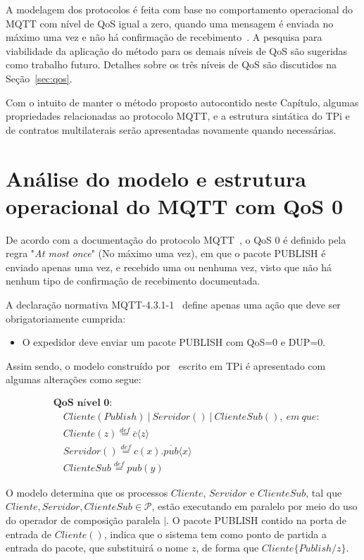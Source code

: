 A modelagem dos protocolos é feita com base no comportamento operacional do MQTT com nível de QoS igual a zero, quando uma mensagem é enviada no máximo uma vez e não há confirmação de recebimento~\cite{mqttv3.1.1}. A pesquisa para viabilidade da aplicação do método para os demais níveis de QoS são sugeridas como trabalho futuro. Detalhes sobre os três níveis de QoS são discutidos na Seção~\ref{sec:qos}.

Com o intuito de manter o método proposto autocontido neste Capítulo, algumas propriedades relacionadas ao protocolo MQTT, e a estrutura sintática do TPi e de contratos multilaterais serão apresentadas novamente quando necessárias.

\section{Análise do modelo e estrutura operacional do MQTT com QoS 0}

De acordo com a documentação do protocolo MQTT~\cite{mqttv3.1.1}, o QoS $0$ é definido pela regra "\textit{At most once}" (No máximo uma vez), em que o pacote PUBLISH é enviado apenas uma vez, e recebido uma ou nenhuma vez, visto que não há nenhum tipo de confirmação de recebimento documentada.

A declaração normativa MQTT-4.3.1-1~\cite{mqttv3.1.1} define apenas uma ação que deve ser obrigatoriamente cumprida:
\begin{itemize}
	\item O expedidor deve enviar um pacote PUBLISH com QoS=0 e DUP=0.
\end{itemize}

Assim sendo, o modelo construído por~\citeauthor{aziz2016formal} escrito em TPi é apresentado com algumas alterações como segue:

\begin{align}
&\textbf{QoS~nível~0:} \nonumber \\
&\quad Cliente(Publish)~|~Servidor()~|~ClienteSub(),~em~que: \nonumber \\
&\quad Cliente(z) \stackrel{def}{=} \overline{c}\langle z \rangle \nonumber \\
&\quad Servidor() \stackrel{def}{=} c(x).\overline{pub}\langle x \rangle \nonumber \\
&\quad ClienteSub \stackrel{def}{=} pub(y) \label{eq:mqtt_qos0}
\end{align}

O modelo determina que os processos $Cliente$, $Servidor$ e $ClienteSub$, tal que $Cliente, Servidor, ClienteSub \in \mathcal{P}$, estão executando em paralelo por meio do uso do operador de composição paralela $|$. O pacote PUBLISH contido na porta de entrada de $Cliente()$, indica que o sistema tem como ponto de partida a entrada do pacote, que substituirá o nome $z$, de forma que $Cliente\{Publish / z\}$. 


